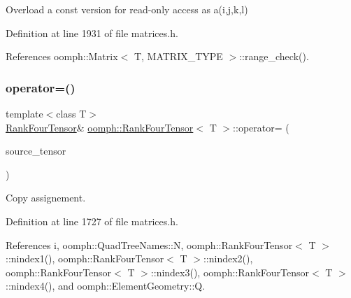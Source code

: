 Overload a const version for read-\/only access as a(i,j,k,l) 



Definition at line 1931 of file matrices.\+h.



References oomph\+::\+Matrix$<$ T, M\+A\+T\+R\+I\+X\+\_\+\+T\+Y\+P\+E $>$\+::range\+\_\+check().

\mbox{\label{classoomph_1_1RankFourTensor_ada0e9ac228c3515b8d785fdf7bd950a3}} 
\subsubsection{\texorpdfstring{operator=()}{operator=()}}
{\footnotesize\ttfamily template$<$class T$>$ \\
\hyperlink{classoomph_1_1RankFourTensor}{Rank\+Four\+Tensor}\& \hyperlink{classoomph_1_1RankFourTensor}{oomph\+::\+Rank\+Four\+Tensor}$<$ T $>$\+::operator= (\begin{DoxyParamCaption}\item[{const \hyperlink{classoomph_1_1RankFourTensor}{Rank\+Four\+Tensor}$<$ T $>$ \&}]{source\+\_\+tensor }\end{DoxyParamCaption})\hspace{0.3cm}{\ttfamily [inline]}}



Copy assignement. 



Definition at line 1727 of file matrices.\+h.



References i, oomph\+::\+Quad\+Tree\+Names\+::N, oomph\+::\+Rank\+Four\+Tensor$<$ T $>$\+::nindex1(), oomph\+::\+Rank\+Four\+Tensor$<$ T $>$\+::nindex2(), oomph\+::\+Rank\+Four\+Tensor$<$ T $>$\+::nindex3(), oomph\+::\+Rank\+Four\+Tensor$<$ T $>$\+::nindex4(), and oomph\+::\+Element\+Geometry\+::Q.

\mbox{\label{classoomph_1_1RankFourTensor_ad9e629184b51ee7cb8074ce6d3641f36}} 
